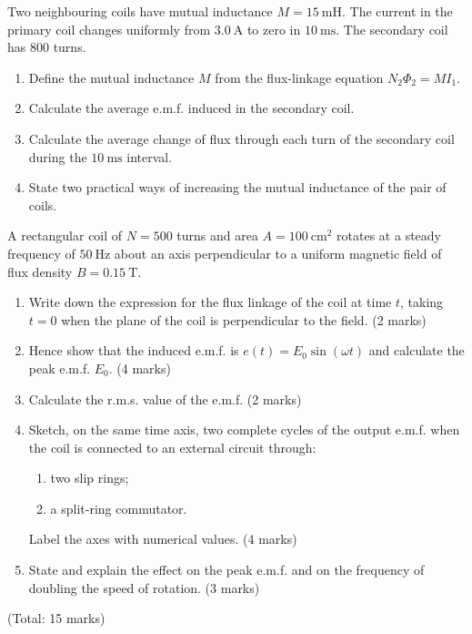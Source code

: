 \documentclass[11pt]{article}
\newcounter{popsec}
\newcounter{popsub}
\newcommand{\courssub}[1]{%
  \stepcounter{popsub}%
  \par\vspace{9pt}\noindent{\popxbold\fontsize{11.5}{13}\selectfont\color{popink}{\color{poporange}\thepopsec.\thepopsub}\hspace{6pt}#1}\par\nopagebreak\vspace{4pt}
}
\begin{document}
\begin{exercice}
Two neighbouring coils have mutual inductance $M = 15\ \mathrm{mH}$. The current in the primary coil changes uniformly from $3.0\ \mathrm{A}$ to zero in $10\ \mathrm{ms}$. The secondary coil has $800$ turns.
\begin{enumerate}
\item Define the mutual inductance $M$ from the flux-linkage equation $N_2\Phi_2 = MI_1$.
\item Calculate the average e.m.f. induced in the secondary coil.
\item Calculate the average change of flux through each turn of the secondary coil during the $10\ \mathrm{ms}$ interval.
\item State two practical ways of increasing the mutual inductance of the pair of coils.
\end{enumerate}
\end{exercice}

\courssub{I prepare for the GCE}

\begin{exercice}
A rectangular coil of $N = 500$ turns and area $A = 100\ \mathrm{cm^2}$ rotates at a steady frequency of $50\ \mathrm{Hz}$ about an axis perpendicular to a uniform magnetic field of flux density $B = 0.15\ \mathrm{T}$.
\begin{enumerate}
\item[(a)] Write down the expression for the flux linkage of the coil at time $t$, taking $t = 0$ when the plane of the coil is perpendicular to the field. \hfill (2 marks)
\item[(b)] Hence show that the induced e.m.f. is $e(t) = E_0\sin(\omega t)$ and calculate the peak e.m.f. $E_0$. \hfill (4 marks)
\item[(c)] Calculate the r.m.s. value of the e.m.f. \hfill (2 marks)
\item[(d)] Sketch, on the same time axis, two complete cycles of the output e.m.f. when the coil is connected to an external circuit through:
\begin{enumerate}
\item[(i)] two slip rings;
\item[(ii)] a split-ring commutator.
\end{enumerate}
Label the axes with numerical values. \hfill (4 marks)
\item[(e)] State and explain the effect on the peak e.m.f. and on the frequency of doubling the speed of rotation. \hfill (3 marks)
\end{enumerate}
\hfill (Total: 15 marks)
\end{exercice}
\end{document}
